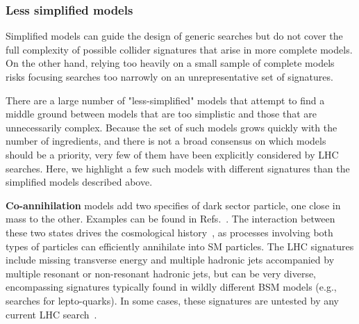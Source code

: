 
\subsubsection{Less simplified models}
\label{sec:LessSimplifiedModels}


Simplified models can guide the design of generic searches but do not cover the full complexity of possible collider signatures that arise in more complete models.
On the other hand, relying too heavily on a small sample of complete models risks focusing searches too narrowly on an unrepresentative set of signatures.

There are a large number of "less-simplified" models that attempt to find a middle ground between models that are too simplistic and those that are unnecessarily complex. Because the set of such models grows quickly with the number of ingredients, and there is not a broad consensus on which models should be a priority, very few of them have been explicitly considered by LHC searches. Here, we highlight a few such models with different signatures than the simplified models described above. 

\textbf{Co-annihilation} models add two specifies of dark sector particle, one close in mass to the other. Examples can be found in Refs.~\cite{Buschmann:2016hkc,Khoze:2017ixx}. The interaction between these two states drives the cosmological history~\cite{Ellis:1999mm}, as processes involving both types of particles can efficiently annihilate into SM particles. The LHC signatures include missing transverse energy and multiple hadronic jets accompanied by multiple resonant or non-resonant hadronic jets, but can be very diverse, encompassing signatures typically found in wildly different BSM models (e.g., searches for lepto-quarks). In some cases, these signatures are untested by any current LHC search~\cite{Buschmann:2016hkc}. 

